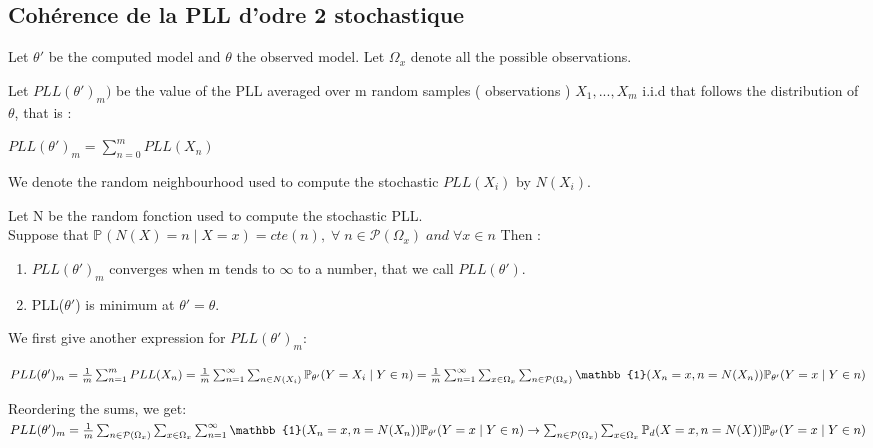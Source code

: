 \documentclass[11 pt]{article}
\begin{document}
\newpage

\subsection{Cohérence de la PLL d'odre 2 stochastique}
Let $\theta'$ be the computed model and $\theta$ the observed model. Let $\Omega_x$ denote all the possible observations.

\quad

Let  $ PLL(\theta')_m)$ be the value of the PLL averaged over m random samples ( observations ) $X_1,...,X_m$ i.i.d that follows the distribution of $\theta$, that is : 

\quad

$PLL(\theta')_m = \sum_{n=0}^{m} PLL(X_n) $

\quad

We denote the random neighbourhood used to compute the stochastic $PLL(X_i)$ by $N(X_i)$.

\begin{theorem}
Let N be the random fonction used to compute the stochastic PLL.\\
Suppose that $\mathbb{P}_{}(N(X) = n  \mid X = x) = cte(n), \; \forall  \; n \in \mathcal{P}(\Omega_x)  \; and \; \forall x \in n$
Then : 
\begin{enumerate}
	\item $ PLL(\theta')_m $ converges when m tends to $\infty$ to a number, that we call $PLL(\theta')$.
	\item PLL($\theta'$) is minimum at $\theta' = \theta$.
\end{enumerate}

\end{theorem}

\quad 

We first give another expression for $PLL(\theta')_m$:

\quad


$PLL(\theta')_m = \frac{1}{m} \sum_{n=1}^{m} PLL(X_n)\\
		= \frac{1}{m} \sum_{n=1}^{\infty} \sum_{n \in N(X_i)}  \mathbb{P}_{\theta '} (Y=X_i \mid Y \in n) \\
		= \frac{1}{m} \sum_{n=1}^{\infty} \sum_{x \in \Omega_x} \sum_{n \in \mathcal{P}(\Omega_x)} \mathbb{1}(X_n = x, n = N(X_n) ) \mathbb{P}_{\theta '} (Y=x \mid Y \in n)
		$

\quad

Reordering the sums, we get: \\
$PLL(\theta')_m \\
		= \frac{1}{m} \sum_{n \in \mathcal{P}(\Omega_x)} \sum_{x \in \Omega_x} \sum_{n=1}^{\infty} \mathbb{1}(X_n = x, n = N(X_n) ) \mathbb{P}_{\theta '} (Y=x \mid Y \in n)
	\\	\to \sum_{n \in \mathcal{P}(\Omega_x)} \sum_{x \in \Omega_x} \mathbb{P}_d(X = x, n = N(X) ) \mathbb{P}_{\theta '} (Y=x \mid Y \in n)
		$
		
\end{document}

